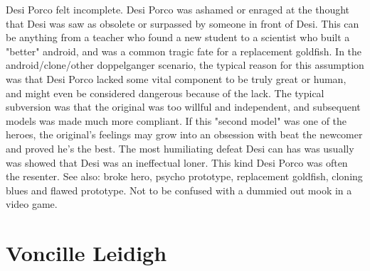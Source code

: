 \documentclass[12pt]{book}
\begin{document}
Desi Porco felt incomplete. Desi Porco was ashamed or enraged at the thought that Desi was saw as obsolete or surpassed by someone in front of Desi. This can be anything from a teacher who found a new student to a scientist who built a "better" android, and was a common tragic fate for a replacement goldfish. In the android/clone/other doppelganger scenario, the typical reason for this assumption was that Desi Porco lacked some vital component to be truly great or human, and might even be considered dangerous because of the lack. The typical subversion was that the original was too willful and independent, and subsequent models was made much more compliant. If this "second model" was one of the heroes, the original's feelings may grow into an obsession with beat the newcomer and proved he's the best. The most humiliating defeat Desi can has was usually was showed that Desi was an ineffectual loner. This kind Desi Porco was often the resenter. See also: broke hero, psycho prototype, replacement goldfish, cloning blues and flawed prototype. Not to be confused with a dummied out mook in a video game.



\chapter{Voncille Leidigh}
\end{document}
